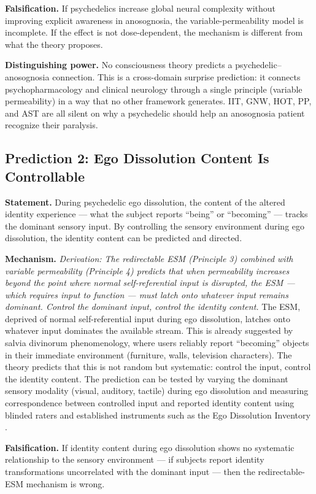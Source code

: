 \documentclass[12pt]{article}
\begin{document}
\textbf{Falsification.} If psychedelics increase global neural complexity without improving explicit awareness in anosognosia, the variable-permeability model is incomplete. If the effect is not dose-dependent, the mechanism is different from what the theory proposes.

\textbf{Distinguishing power.} No consciousness theory predicts a psychedelic--anosognosia connection. This is a cross-domain surprise prediction: it connects psychopharmacology and clinical neurology through a single principle (variable permeability) in a way that no other framework generates. IIT, GNW, HOT, PP, and AST are all silent on why a psychedelic should help an anosognosia patient recognize their paralysis.


\subsection{Prediction 2: Ego Dissolution Content Is Controllable}


\textbf{Statement.} During psychedelic ego dissolution, the content of the altered identity experience --- what the subject reports ``being'' or ``becoming'' --- tracks the dominant sensory input. By controlling the sensory environment during ego dissolution, the identity content can be predicted and directed.

\textbf{Mechanism.} \emph{Derivation: The redirectable ESM (Principle 3) combined with variable permeability (Principle 4) predicts that when permeability increases beyond the point where normal self-referential input is disrupted, the ESM --- which requires input to function --- must latch onto whatever input remains dominant. Control the dominant input, control the identity content.} The ESM, deprived of normal self-referential input during ego dissolution, latches onto whatever input dominates the available stream. This is already suggested by salvia divinorum phenomenology, where users reliably report ``becoming'' objects in their immediate environment (furniture, walls, television characters). The theory predicts that this is not random but systematic: control the input, control the identity content. The prediction can be tested by varying the dominant sensory modality (visual, auditory, tactile) during ego dissolution and measuring correspondence between controlled input and reported identity content using blinded raters and established instruments such as the Ego Dissolution Inventory \citep{Nour2016}.

\textbf{Falsification.} If identity content during ego dissolution shows no systematic relationship to the sensory environment --- if subjects report identity transformations uncorrelated with the dominant input --- then the redirectable-ESM mechanism is wrong.
\end{document}
